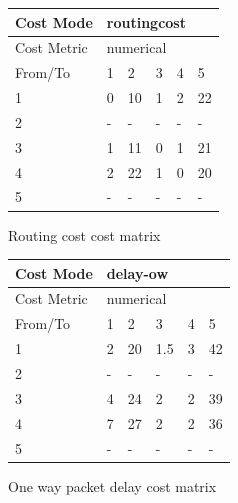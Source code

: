 \begin{figure}
    \centering
    \begin{subtable}{.46\linewidth}
        \centering
        \begin{tabular}{|l|l|l|l|l|l|}
        \hline
        Cost Mode   & \multicolumn{5}{|l|}{routingcost} \\ \hline
        Cost Metric & \multicolumn{5}{|l|}{numerical}   \\ \hline
        From/To     & 1    & 2     & 3   & 4   & 5      \\ \hline
        1           & 0    & 10    & 1   & 2   & 22     \\ \hline
        2           & -    & -     & -   & -   & -      \\ \hline
        3           & 1    & 11    & 0   & 1   & 21     \\ \hline
        4           & 2    & 22    & 1   & 0   & 20     \\ \hline
        5           & -    & -     & -   & -   & -      \\ \hline
        \end{tabular}
    \caption{Routing cost cost matrix}
    \end{subtable}
    \begin{subtable}{.46\linewidth}
        \centering
        \begin{tabular}{|l|l|l|l|l|l|}
        \hline
        Cost Mode   & \multicolumn{5}{|l|}{delay-ow}    \\ \hline
        Cost Metric & \multicolumn{5}{|l|}{numerical}   \\ \hline
        From/To     & 1    & 2     & 3   & 4   & 5      \\ \hline
        1           & 2    & 20    & 1.5 & 3   & 42     \\ \hline
        2           & -    & -     & -   & -   & -      \\ \hline
        3           & 4    & 24    & 2   & 2   & 39     \\ \hline
        4           & 7    & 27    & 2   & 2   & 36     \\ \hline
        5           & -    & -     & -   & -   & -      \\ \hline
        \end{tabular}
    \caption{One way packet delay cost matrix}
    \end{subtable}
    \begin{subtable}{.65\linewidth}
        \centering
        \hspace{-4em}

\end{subtable}
\end{figure}
